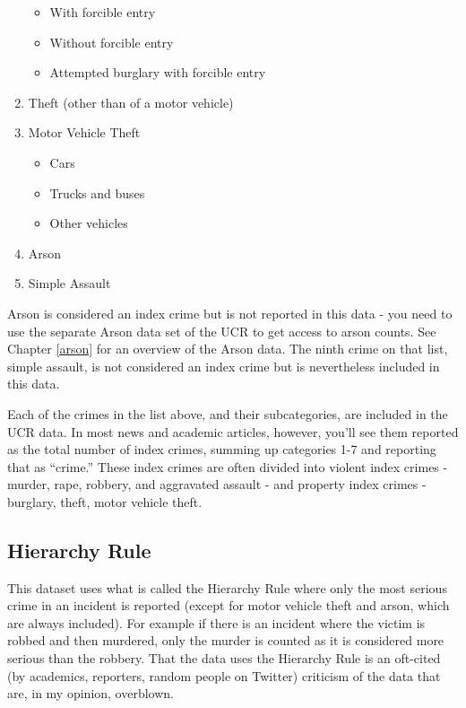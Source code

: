 \documentclass[
  12pt,
  openany]{book}
\providecommand{\tightlist}{%
  \setlength{\itemsep}{0pt}\setlength{\parskip}{0pt}}
\begin{document}
\begin{enumerate}
  \begin{itemize}
  \tightlist
  \item
    With forcible entry\\
  \item
    Without forcible entry\\
  \item
    Attempted burglary with forcible entry\\
  \end{itemize}
\item
  Theft (other than of a motor vehicle)\\
\item
  Motor Vehicle Theft

  \begin{itemize}
  \tightlist
  \item
    Cars\\
  \item
    Trucks and buses\\
  \item
    Other vehicles\\
  \end{itemize}
\item
  Arson\\
\item
  Simple Assault
\end{enumerate}

Arson is considered an index crime but is not reported in this data - you need to use the separate Arson data set of the UCR to get access to arson counts. See Chapter \ref{arson} for an overview of the Arson data. The ninth crime on that list, simple assault, is not considered an index crime but is nevertheless included in this data.

Each of the crimes in the list above, and their subcategories, are included in the UCR data. In most news and academic articles, however, you'll see them reported as the total number of index crimes, summing up categories 1-7 and reporting that as ``crime.'' These index crimes are often divided into violent index crimes - murder, rape, robbery, and aggravated assault - and property index crimes - burglary, theft, motor vehicle theft.

\hypertarget{hierarchy-rule}{%
\subsection{Hierarchy Rule}\label{hierarchy-rule}}

This dataset uses what is called the Hierarchy Rule where only the most serious crime in an incident is reported (except for motor vehicle theft and arson, which are always included). For example if there is an incident where the victim is robbed and then murdered, only the murder is counted as it is considered more serious than the robbery. That the data uses the Hierarchy Rule is an oft-cited (by academics, reporters, random people on Twitter) criticism of the data that are, in my opinion, overblown.
\end{document}
